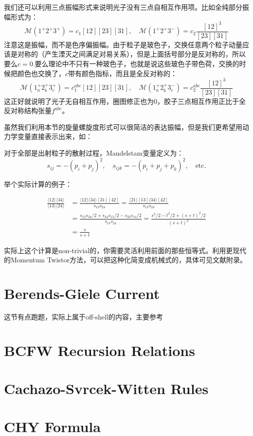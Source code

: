 我们还可以利用三点振幅形式来说明光子没有三点自相互作用项。比如全纯部分振幅形式为：
\begin{equation}
	\mathcal{M}(1^+2^+3^+)=c_1[12][23][31],\quad\mathcal{M}(1^+2^+3^-)=c_2\frac{[12]^3}{[23][31]}
\end{equation}
注意这是振幅，而不是色序偏振幅。由于粒子是玻色子，交换任意两个粒子动量应该是对称的（产生湮灭之间满足对易关系），但是上面括号部分是反对称的，所以要么$c=0$.要么理论中不只有一种玻色子，也就是说这些玻色子带色荷，交换的时候把颜色也交换了，$c$带有颜色指标，而且是全反对称的：
\begin{equation}
	\mathcal{M}(1_a^+2_b^+3_c^+)=c_1^{abc}[12][23][31],\quad\mathcal{M}(1_a^+2_b^+3_c^-)=c_2^{abc}\frac{[12]^3}{[23][31]}
\end{equation}
这正好就说明了光子无自相互作用，圈图修正也为0，胶子三点相互作用正比于全反对称结构张量$f^{abc}$。

虽然我们利用本节的旋量螺旋度形式可以很简洁的表达振幅，但是我们更希望用动力学变量直接表示出来，如：
\begin{definition}
	对于全部是出射粒子的散射过程，Mandelstam变量定义为：
	\begin{equation}
		s_{ij}=-(p_i+p_j)^2,\quad s_{ijk}=-(p_i+p_j+p_k)^2,\quad\text{etc}.
	\end{equation}
\end{definition}
举个实际计算的例子：
\begin{example}
	\begin{equation}
		\begin{aligned}
		\frac{\langle12\rangle\langle34\rangle}{\langle13\rangle\langle24\rangle}& =\frac{\langle12\rangle\langle34\rangle[31][42]}{s_{13}s_{24}}=\frac{\langle21\rangle[13]\langle34\rangle[42]}{s_{13}s_{24}}  \\
		&=\frac{s_{12}s_{34}/2+s_{24}s_{13}/2-s_{23}s_{14}/2}{s_{13}s_{24}}=\frac{s^2/2-t^2/2+(s+t)^2/2}{(s+t)^2} \\
		&=\frac s{s+t}
	\end{aligned}
	\end{equation}
\end{example}
实际上这个计算是non-trivial的，你需要灵活利用前面的那些恒等式。利用更现代的Momentum Twistor方法，可以把这种化简变成机械式的，具体可见文献\cite{Badger:2013gxa}附录。

\section{Berends-Giele Current}
这节有点跑题，实际上属于off-shell的内容，主要参考\cite{Dixon:1996wi,Mangano:1990by}
\section{BCFW Recursion Relations}
\section{Cachazo-Svrcek-Witten Rules}
\section{CHY Formula}